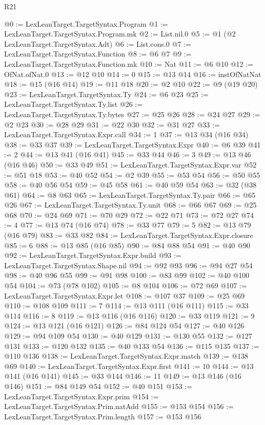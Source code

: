 \begin{lexlean}{R21}
\begin{coremodule}
@0 := LexLeanTarget.TargetSyntax.Program
@1 := LexLeanTarget.TargetSyntax.Program.mk
@2 := List.nil.{0}
@5 := @1 (@2 LexLeanTarget.TargetSyntax.Adt)
@6 := List.cons.{0}
@7 := LexLeanTarget.TargetSyntax.Function
@8 := @6 @7
@9 := LexLeanTarget.TargetSyntax.Function.mk
@10 := Nat
@11 := @6 @10
@12 := OfNat.ofNat.{0}
@13 := @12 @10
@14 := 0
@15 := @13 @14
@16 := instOfNatNat
@18 := @15 (@16 @14)
@19 := @11 @18
@20 := @2 @10
@22 := @9 (@19 @20)
@23 := LexLeanTarget.TargetSyntax.Ty
@24 := @6 @23
@25 := LexLeanTarget.TargetSyntax.Ty.list
@26 := LexLeanTarget.TargetSyntax.Ty.bytes
@27 := @25 @26
@28 := @24 @27
@29 := @2 @23
@30 := @28 @29
@31 := @22 @30
@32 := @31 @27
@33 := LexLeanTarget.TargetSyntax.Expr.call
@34 := 1
@37 := @13 @34 (@16 @34)
@38 := @33 @37
@39 := LexLeanTarget.TargetSyntax.Expr
@40 := @6 @39
@41 := 2
@44 := @13 @41 (@16 @41)
@45 := @33 @44
@46 := 3
@49 := @13 @46 (@16 @46)
@50 := @33 @49
@51 := LexLeanTarget.TargetSyntax.Expr.var
@52 := @51 @18
@53 := @40 @52
@54 := @2 @39
@55 := @53 @54
@56 := @50 @55
@58 := @40 @56 @54
@59 := @45 @58
@61 := @40 @59 @54
@63 := @32 (@38 @61)
@64 := @8 @63
@65 := LexLeanTarget.TargetSyntax.Ty.pair
@66 := @65 @26
@67 := LexLeanTarget.TargetSyntax.Ty.unit
@68 := @66 @67
@69 := @25 @68
@70 := @24 @69
@71 := @70 @29
@72 := @22 @71
@73 := @72 @27
@74 := 4
@77 := @13 @74 (@16 @74)
@78 := @33 @77
@79 := 5
@82 := @13 @79 (@16 @79)
@83 := @33 @82
@84 := LexLeanTarget.TargetSyntax.Expr.closure
@85 := 6
@88 := @13 @85 (@16 @85)
@90 := @84 @88 @54
@91 := @40 @90
@92 := LexLeanTarget.TargetSyntax.Expr.build
@93 := LexLeanTarget.TargetSyntax.Shape.nil
@94 := @92 @93
@96 := @94 @27 @54
@98 := @40 @96 @55
@99 := @91 @98
@100 := @83 @99
@102 := @40 @100 @54
@104 := @73 (@78 @102)
@105 := @8 @104
@106 := @72 @69
@107 := LexLeanTarget.TargetSyntax.Expr.let
@108 := @107 @37
@109 := @25 @69
@110 := @108 @109
@111 := 7
@114 := @13 @111 (@16 @111)
@115 := @33 @114
@116 := 8
@119 := @13 @116 (@16 @116)
@120 := @33 @119
@121 := 9
@124 := @13 @121 (@16 @121)
@126 := @84 @124 @54
@127 := @40 @126
@129 := @94 @109 @54
@130 := @40 @129
@131 := @130 @55
@132 := @127 @131
@133 := @120 @132
@135 := @40 @133 @54
@136 := @115 @135
@137 := @110 @136
@138 := LexLeanTarget.TargetSyntax.Expr.match
@139 := @138 @69
@140 := LexLeanTarget.TargetSyntax.Expr.first
@141 := 10
@144 := @13 @141 (@16 @141)
@145 := @33 @144
@146 := 11
@149 := @13 @146 (@16 @146)
@151 := @84 @149 @54
@152 := @40 @151
@153 := LexLeanTarget.TargetSyntax.Expr.prim
@154 := LexLeanTarget.TargetSyntax.Prim.natAdd
@155 := @153 @154
@156 := LexLeanTarget.TargetSyntax.Prim.length
@157 := @153 @156

\end{coremodule}
\end{lexlean}
